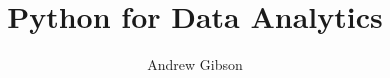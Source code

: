 \documentclass{layout/qut-report}
\begin{document}
\frontmatter

\title{Python for Data Analytics}
\author{Andrew Gibson}




%

%

%

\renewcommand{\baselinestretch}{1.3}\normalsize %
\tableofcontents
\renewcommand{\baselinestretch}{1.0}\normalsize
%
\renewcommand{\baselinestretch}{1.0}\normalsize
\mainmatter

%



















%
\end{document}
